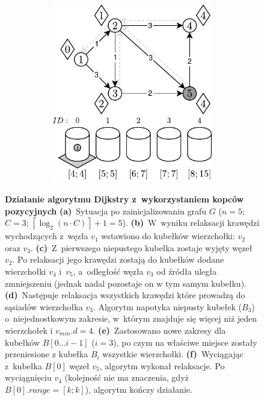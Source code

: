\begin{figure}[!ht]
\begin{subfigure}[b]{\textwidth}
\begin{subfigure}[b]{0.32\textwidth}
			\caption{}
			\label{fig:exampleRadixHeapNC:e}
		\end{subfigure}
		\hfill
		\begin{subfigure}[b]{0.32\textwidth}
			\includegraphics[width=\textwidth]{Chapter_II/RADIX-HEAP-NC-Example/f.pdf}
			\caption{}
			\label{fig:exampleRadixHeapNC:f}
		\end{subfigure}
		\hfill\null
	\end{subfigure}
	\caption{
		\textbf{Działanie algorytmu Dijkstry z~wykorzystaniem kopców pozycyjnych}
		\textbf{(a)}~Sytuacja po zainicjalizowaniu grafu $G$ ($n=5$; $C=3$; $ \left \lceil \log_{2} \left( n \cdot C \right) \right \rceil + 1 = 5$).
		\textbf{(b)}~W~wyniku relaksacji krawędzi wychodzących z~węzła $v_{1}$ wstawiono do kubełków wierzchołki: $v_{2}$ oraz $v_{3}$.
		\textbf{(c)}~Z~pierwszego niepustego kubełka zostaje wyjęty węzeł $v_{2}$.
		Po relaksacji jego krawędzi zostają do kubełków dodane wierzchołki $v_{4}$ i~$v_{5}$, a~odległość węzła $v_{3}$ od źródła uległa zmniejszeniu (jednak nadal pozostaje on w tym samym kubełku).
		\textbf{(d)}~Następuje relaksacja wszystkich krawędzi które prowadzą do sąsiadów wierzchołka $v_{3}$.
		Algorytm napotyka niepusty kubełek ($B_{3}$) o~niejednostkowym zakresie, w~którym znajduje się więcej niż jeden wierzchołek i $v_{min}.d = 4$.
		\textbf{(e)}~Zastosowano nowe zakresy dla kubełków $B \left[ 0 \dots i-1 \right]$ ($i=3$), po czym na właściwe miejsce zostały przeniesione z kubełka $B_{i}$ wszystkie wierzchołki.
		\textbf{(f)}~Wyciągając z~kubełka $B \left[ 0 \right]$ węzeł $v_{5}$, algorytm wykonał relaksacje.
		Po wyciągnięciu $v_{4}$ (kolejność nie ma znaczenia, gdyż $B \left[ 0 \right].range = \left[ k ; k \right]$), algorytm kończy działanie.
	}
	\label{fig:exampleRadixHeapNC}
\end{figure}


